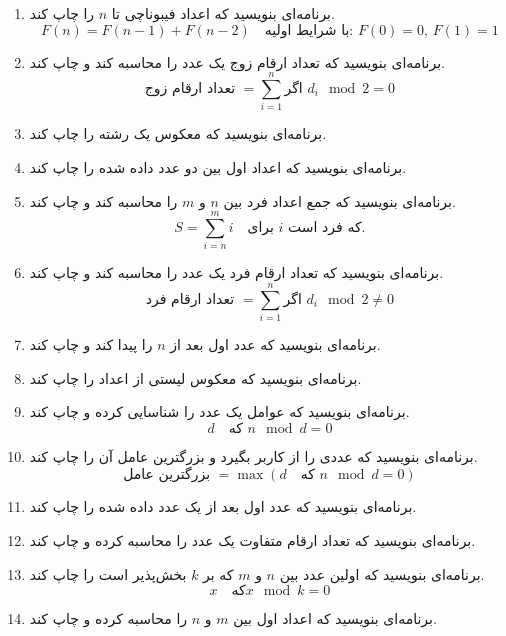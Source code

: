 \documentclass[b5paper,12pt]{article}
\begin{document}
	\begin{enumerate}
		\item برنامه‌ای بنویسید که اعداد فیبوناچی تا \(n\) را چاپ کند. 
		\[
		F(n) = F(n-1) + F(n-2) \quad \text{با شرایط اولیه: } F(0) = 0, \, F(1) = 1
		\]
		
		\item برنامه‌ای بنویسید که تعداد ارقام زوج یک عدد را محاسبه کند و چاپ کند.
		\[
		\text{تعداد ارقام زوج } = \sum_{i=1}^{n} \text{اگر } d_i \mod 2 = 0
		\]
		
		\item برنامه‌ای بنویسید که معکوس یک رشته را چاپ کند.
		
		\item برنامه‌ای بنویسید که اعداد اول بین دو عدد داده شده را چاپ کند.
		
		\item برنامه‌ای بنویسید که جمع اعداد فرد بین \(n\) و \(m\) را محاسبه کند و چاپ کند.
		\[
		S = \sum_{i=n}^{m} i \quad \text{برای } i \text{ که فرد است.}
		\]
		
		\item برنامه‌ای بنویسید که تعداد ارقام فرد یک عدد را محاسبه کند و چاپ کند.
		\[
		\text{تعداد ارقام فرد } = \sum_{i=1}^{n} \text{اگر } d_i \mod 2 \neq 0
		\]
		
		\item برنامه‌ای بنویسید که عدد اول بعد از \(n\) را پیدا کند و چاپ کند.
		
		\item برنامه‌ای بنویسید که معکوس لیستی از اعداد را چاپ کند.
		
		\item برنامه‌ای بنویسید که عوامل یک عدد را شناسایی کرده و چاپ کند.
		\[
		d \quad \text{که } n \mod d = 0
		\]
		
		\item برنامه‌ای بنویسید که عددی را از کاربر بگیرد و بزرگترین عامل آن را چاپ کند.
		\[
		\text{بزرگترین عامل } = \max(d \quad \text{که } n \mod d = 0)
		\]
		
		\item برنامه‌ای بنویسید که عدد اول بعد از یک عدد داده شده را چاپ کند.
		
		\item برنامه‌ای بنویسید که تعداد ارقام متفاوت یک عدد را محاسبه کرده و چاپ کند.
		
		\item برنامه‌ای بنویسید که اولین عدد بین \(n\) و \(m\) که بر \(k\) بخش‌پذیر است را چاپ کند.
		\[
		x \quad \text{که} x \mod k = 0
		\]
		
		\item برنامه‌ای بنویسید که اعداد اول بین \(m\) و \(n\) را محاسبه کرده و چاپ کند.
		

\end{enumerate}
\end{document}
